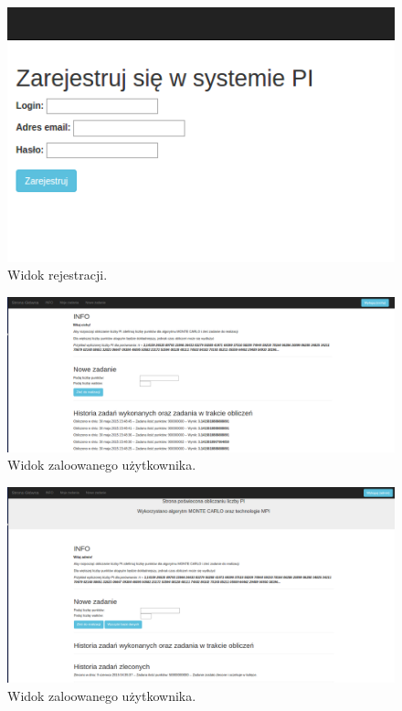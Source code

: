 \documentclass[a4paper,12pt]{article}		%
\begin{document}
\begin{center}
\begin{figure}[h!]
\centering
\includegraphics[scale=0.7]{Resources/registerSite.png}
\caption{Widok rejestracji.} 
\end{figure} 
\end{center}

\begin{center}
\begin{figure}[h!]
\centering
\includegraphics[scale=0.4]{Resources/logInSite.png}
\caption{Widok zaloowanego użytkownika.} 
\end{figure} 
\end{center}

\begin{center}
\begin{figure}[h!]
\centering
\includegraphics[scale=0.4]{Resources/adminLoginSite.png}
\caption{Widok zaloowanego użytkownika.} 
\end{figure} 
\end{center}
\newpage
\end{document}
